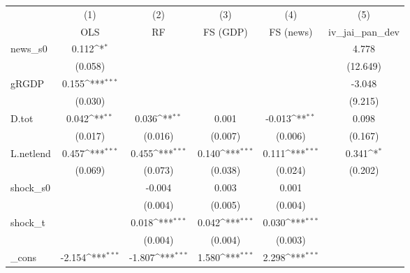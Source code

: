 {
\def\sym#1{\ifmmode^{#1}\else\(^{#1}\)\fi}
\begin{tabular}{l*{5}{c}}
\toprule
            &\multicolumn{1}{c}{(1)}&\multicolumn{1}{c}{(2)}&\multicolumn{1}{c}{(3)}&\multicolumn{1}{c}{(4)}&\multicolumn{1}{c}{(5)}\\
            &\multicolumn{1}{c}{OLS}&\multicolumn{1}{c}{RF}&\multicolumn{1}{c}{FS (GDP)}&\multicolumn{1}{c}{FS (news)}&\multicolumn{1}{c}{iv\_jai\_pan\_dev}\\
\midrule
news\_s0     &       0.112\sym{*}  &                     &                     &                     &       4.778         \\
            &     (0.058)         &                     &                     &                     &    (12.649)         \\
\addlinespace
gRGDP       &       0.155\sym{***}&                     &                     &                     &      -3.048         \\
            &     (0.030)         &                     &                     &                     &     (9.215)         \\
\addlinespace
D.tot       &       0.042\sym{**} &       0.036\sym{**} &       0.001         &      -0.013\sym{**} &       0.098         \\
            &     (0.017)         &     (0.016)         &     (0.007)         &     (0.006)         &     (0.167)         \\
\addlinespace
L.netlend   &       0.457\sym{***}&       0.455\sym{***}&       0.140\sym{***}&       0.111\sym{***}&       0.341\sym{*}  \\
            &     (0.069)         &     (0.073)         &     (0.038)         &     (0.024)         &     (0.202)         \\
\addlinespace
shock\_s0    &                     &      -0.004         &       0.003         &       0.001         &                     \\
            &                     &     (0.004)         &     (0.005)         &     (0.004)         &                     \\
\addlinespace
shock\_t     &                     &       0.018\sym{***}&       0.042\sym{***}&       0.030\sym{***}&                     \\
            &                     &     (0.004)         &     (0.004)         &     (0.003)         &                     \\
\addlinespace
\_cons      &      -2.154\sym{***}&      -1.807\sym{***}&       1.580\sym{***}&       2.298\sym{***}&                     \\

\end{tabular}}
